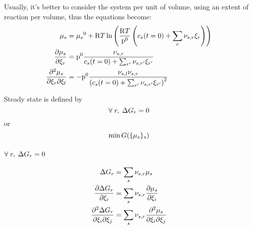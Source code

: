 Usually, it's better to consider the system per unit of volume, 
using an extent of reaction per volume, thus the equations
become:
\begin{equation}
\begin{split}
\chempot[s]                     & = \chempotZ[s] + \Rg\Temp\ln\left(\frac{\Rg \Temp}{\pz}\left(\molar[s](t=0) + \sum_r \scoef[s,r]\ext[r]\right)\right) \\
\doverdext[r]{\chempot[s]}      & = \pz\frac{\scoef[s,r]}{\molar[s](t=0) + \sum_{r'} \scoef[s,r']\ext[r']}\\
\ddoverddext{\chempot[s]}{r}{l} & = -\pz\frac{\scoef[s,l]\scoef[s,r]}{\left(\molar[s](t=0) + \sum_{r'} \scoef[s,r']\ext[r']\right)^2}\\
\end{split}
\end{equation}

Steady state is defined by 
\begin{equation}
\forall\; r,\; \DGibbs_r = 0
\end{equation} 
or 
\begin{equation}
\min \Gibbs(\{\chempot[s]\}_s)
\end{equation}

\subsubsection{\texorpdfstring{$\forall\;r,\;\DGibbs_r = 0$}{Reaction enthalpy}}

\begin{equation}
\begin{split}
\DGibbs_r & = \sum_s \scoef[s,r] \chempot[s]\\
\doverdext[i]{\DGibbs_r}   & = \sum_s\scoef[s,r]\doverdext[i]{\chempot[s]} \\
\ddoverddext{\DGibbs_r}{i}{j} & = \sum_s\scoef[s,r]\ddoverddext{\chempot[s]}{i}{j} \\
\end{split}
\end{equation}

